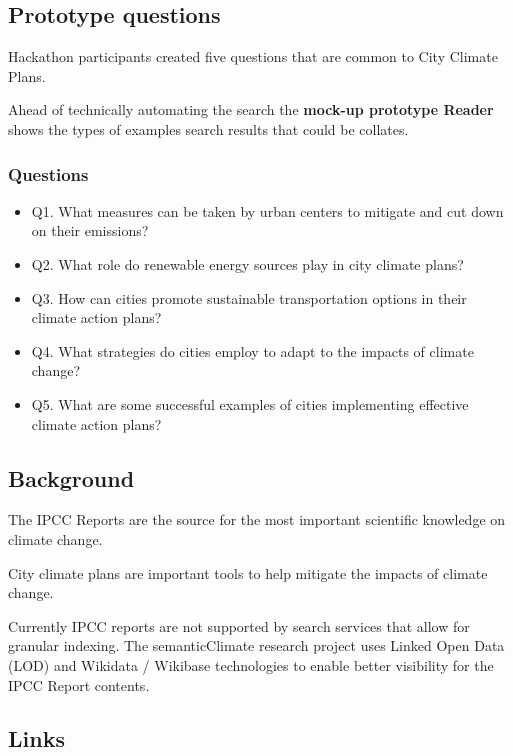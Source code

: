 \documentclass[
  letterpaper,
  DIV=11,
  numbers=noendperiod]{scrreprt}
\providecommand{\tightlist}{%
  \setlength{\itemsep}{0pt}\setlength{\parskip}{0pt}}\usepackage{longtable,booktabs,array}
\begin{document}
\hypertarget{prototype-questions}{%
\subsection{Prototype questions}\label{prototype-questions}}

Hackathon participants created five questions that are common to City
Climate Plans.

Ahead of technically automating the search the \textbf{mock-up prototype
Reader} shows the types of examples search results that could be
collates.

\hypertarget{questions}{%
\subsubsection{Questions}\label{questions}}

\begin{itemize}
\tightlist
\item
  Q1. What measures can be taken by urban centers to mitigate and cut
  down on their emissions?
\item
  Q2. What role do renewable energy sources play in city climate plans?
\item
  Q3. How can cities promote sustainable transportation options in their
  climate action plans?
\item
  Q4. What strategies do cities employ to adapt to the impacts of
  climate change?
\item
  Q5. What are some successful examples of cities implementing effective
  climate action plans?
\end{itemize}

\hypertarget{background}{%
\subsection{Background}\label{background}}

The IPCC Reports are the source for the most important scientific
knowledge on climate change.

City climate plans are important tools to help mitigate the impacts of
climate change.

Currently IPCC reports are not supported by search services that allow
for granular indexing. The semanticClimate research project uses Linked
Open Data (LOD) and Wikidata / Wikibase technologies to enable better
visibility for the IPCC Report contents.

\hypertarget{links}{%
\subsection{Links}\label{links}}
\end{document}
